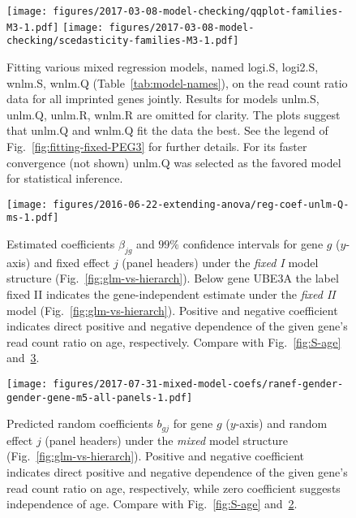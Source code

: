 \documentclass[letterpaper]{article}
\begin{document}
\begin{figure}[H]
\begin{center}
\texttt{[image: figures/2017-03-08-model-checking/qqplot-families-M3-1.pdf]}
\texttt{[image: figures/2017-03-08-model-checking/scedasticity-families-M3-1.pdf]}
\end{center}
\caption{
Fitting various mixed regression models, named logi.S, logi2.S, wnlm.S,
wnlm.Q (Table~\ref{tab:model-names}), on the read count ratio data for all
imprinted genes jointly.  Results for models unlm.S, unlm.Q, unlm.R, wnlm.R are omitted for
clarity.  The plots suggest
that unlm.Q and wnlm.Q fit the data the best.  See the legend of
Fig.~\ref{fig:fitting-fixed-PEG3} for further details. For its faster convergence 
(not shown) unlm.Q was selected as the favored model for statistical inference.
}
\label{fig:fitting-mixed}
\end{figure}

\begin{figure}[H]
\begin{center}
\texttt{[image: figures/2016-06-22-extending-anova/reg-coef-unlm-Q-ms-1.pdf]}
\end{center}
\caption{
Estimated coefficients \(\beta_{jg}\) and \(99\%\) confidence intervals for
gene \(g\) (\(y\)-axis) and fixed effect \(j\) (panel headers) under the
\emph{fixed I} model structure (Fig.~\ref{fig:glm-vs-hierarch}).  Below gene
UBE3A the label fixed II indicates the gene-independent estimate under the \emph{fixed II} model
(Fig.~\ref{fig:glm-vs-hierarch}).  Positive and negative coefficient indicates
direct positive and negative dependence of the given gene's read count ratio
on age, respectively.  Compare with Fig.~\ref{fig:S-age}
and~\ref{fig:pred-rnd-coefs}.
}
\label{fig:pred-fixed-coefs}
\end{figure}

\begin{figure}[H]
\begin{center}
\texttt{[image: figures/2017-07-31-mixed-model-coefs/ranef-gender-gender-gene-m5-all-panels-1.pdf]}
\end{center}
\caption{
Predicted random coefficients \(b_{gj}\) for gene \(g\) (\(y\)-axis) and
random effect \(j\) (panel headers) under the \emph{mixed} model structure
(Fig.~\ref{fig:glm-vs-hierarch}). Positive and negative coefficient indicates direct positive and
negative dependence of the given gene's read count ratio on age, respectively,
while zero coefficient suggests independence of age.  Compare with
Fig.~\ref{fig:S-age} and~\ref{fig:pred-fixed-coefs}.
}
\label{fig:pred-rnd-coefs}
\end{figure}
\end{document}
